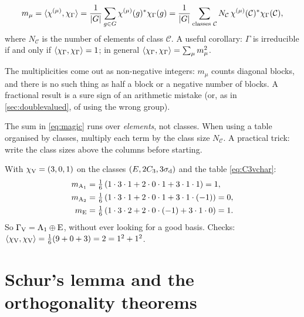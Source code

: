 \begin{keyresult}
\begin{equation}\label{eq:magic}
  m_\mu=\langle \chi^{(\mu)}, \chi_\Gamma\rangle
      =\frac{1}{\lvert G\rvert}\sum_{g\in G}\chi^{(\mu)}(g)^{*}\chi_\Gamma(g)
      =\frac{1}{\lvert G\rvert}\sum_{\text{classes }\mathcal{C}}N_{\mathcal{C}}\,
        \chi^{(\mu)}(\mathcal{C})^{*}\chi_\Gamma(\mathcal{C}),
\end{equation}
where $N_{\mathcal{C}}$ is the number of elements of class $\mathcal{C}$. A useful
corollary: $\Gamma$ is irreducible if and only if $\langle \chi_\Gamma, \chi_\Gamma\rangle=1$;
in general $\langle \chi_\Gamma, \chi_\Gamma\rangle=\sum_\mu m_\mu^2$.
\end{keyresult}

The multiplicities come out as non-negative integers: $m_\mu$ counts diagonal blocks,
and there is no such thing as half a block or a negative number of blocks. A
fractional result is a sure sign of an arithmetic mistake (or, as in
\cref{sec:doublevalued}, of using the wrong group).

\begin{remark}
The sum in \eqref{eq:magic} runs over \emph{elements}, not classes. When using a
table organised by classes, multiply each term by the class size $N_{\mathcal{C}}$.
A practical trick: write the class sizes above the columns before starting.
\end{remark}

\begin{example}[Decomposing $\GV$ of $\Cv{3}$]
With $\chi_{\mathrm{V}}=(3,0,1)$ on the classes $(E,2C_3,3\sigma_{\mathrm{d}})$ and the table \eqref{eq:C3vchar}:
\begin{align*}
m_{\mathrm{A}_1}&=\tfrac16\,(1\cdot3\cdot1+2\cdot0\cdot1+3\cdot1\cdot1)=1,\\
m_{\mathrm{A}_2}&=\tfrac16\,(1\cdot3\cdot1+2\cdot0\cdot1+3\cdot1\cdot(-1))=0,\\
m_{\mathrm{E}}&=\tfrac16\,(1\cdot3\cdot2+2\cdot0\cdot(-1)+3\cdot1\cdot0)=1.
\end{align*}
So $\Gamma_{\mathrm{V}}=\mathrm{A}_1\oplus\mathrm{E}$, without ever looking for a good basis. Checks:
$\langle \chi_{\mathrm{V}}, \chi_{\mathrm{V}}\rangle=\frac16(9+0+3)=2=1^2+1^2$.
\end{example}

\section{Schur's lemma and the orthogonality theorems\beyondmark}\label{sec:proofs}

